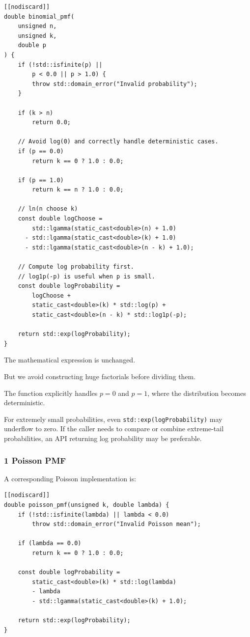 \begin{verbatim}
[[nodiscard]]
double binomial_pmf(
    unsigned n,
    unsigned k,
    double p
) {
    if (!std::isfinite(p) ||
        p < 0.0 || p > 1.0) {
        throw std::domain_error("Invalid probability");
    }

    if (k > n)
        return 0.0;

    // Avoid log(0) and correctly handle deterministic cases.
    if (p == 0.0)
        return k == 0 ? 1.0 : 0.0;

    if (p == 1.0)
        return k == n ? 1.0 : 0.0;

    // ln(n choose k)
    const double logChoose =
        std::lgamma(static_cast<double>(n) + 1.0)
      - std::lgamma(static_cast<double>(k) + 1.0)
      - std::lgamma(static_cast<double>(n - k) + 1.0);

    // Compute log probability first.
    // log1p(-p) is useful when p is small.
    const double logProbability =
        logChoose +
        static_cast<double>(k) * std::log(p) +
        static_cast<double>(n - k) * std::log1p(-p);

    return std::exp(logProbability);
}
\end{verbatim}

The mathematical expression is unchanged.

But we avoid constructing huge factorials before dividing them.

The function explicitly handles \(p=0\) and \(p=1\), where the distribution becomes deterministic.

For extremely small probabilities, even \texttt{std::exp(logProbability)} may underflow to zero. If the caller needs to compare or combine extreme-tail probabilities, an API returning log probability may be preferable.

\subsubsection{1 Poisson PMF}\label{02-foundations-ii-ch031-poisson-pmf}

A corresponding Poisson implementation is:

\begin{verbatim}
[[nodiscard]]
double poisson_pmf(unsigned k, double lambda) {
    if (!std::isfinite(lambda) || lambda < 0.0)
        throw std::domain_error("Invalid Poisson mean");

    if (lambda == 0.0)
        return k == 0 ? 1.0 : 0.0;

    const double logProbability =
        static_cast<double>(k) * std::log(lambda)
        - lambda
        - std::lgamma(static_cast<double>(k) + 1.0);

    return std::exp(logProbability);
}
\end{verbatim}


